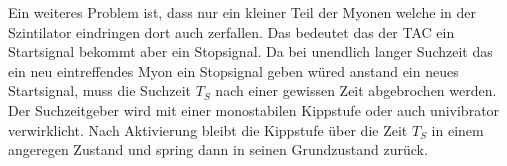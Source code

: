 Ein weiteres Problem ist, dass nur ein kleiner Teil der Myonen welche in der Szintilator eindringen dort auch zerfallen.
Das bedeutet das der TAC ein Startsignal bekommt aber ein Stopsignal.
Da bei unendlich langer Suchzeit das ein neu eintreffendes Myon ein Stopsignal geben würed anstand ein neues Startsignal,
muss die Suchzeit $T_S$ nach einer gewissen Zeit abgebrochen werden.
Der Suchzeitgeber wird mit einer monostabilen Kippstufe oder auch univibrator verwirklicht.
Nach Aktivierung bleibt die Kippstufe über die Zeit $T_S$ in einem angeregen Zustand und spring dann in seinen Grundzustand zurück.
